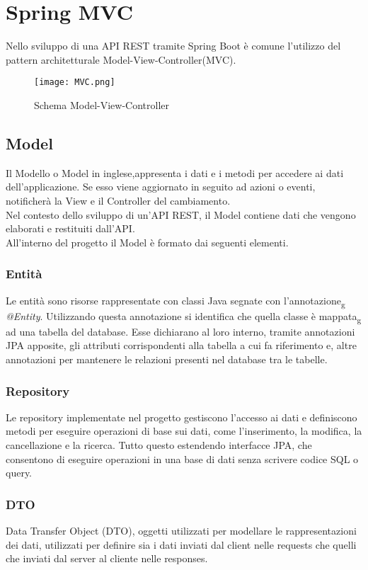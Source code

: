 \section{Spring MVC}
Nello sviluppo di una API REST tramite Spring Boot è comune l'utilizzo del pattern architetturale Model-View-Controller(MVC).\\

\begin{figure}[!h] 
    \centering 
    \texttt{[image: MVC.png]} 
    \caption{Schema Model-View-Controller}
\end{figure}

\subsection{Model}
Il Modello o Model in inglese,appresenta i dati e i metodi per accedere ai dati dell'applicazione. Se esso viene aggiornato in seguito ad azioni o eventi, notificherà la View e il Controller del cambiamento.\\
Nel contesto dello sviluppo di un'API REST, il Model contiene dati che vengono elaborati e restituiti dall'API.\\
All'interno del progetto il Model è formato dai seguenti elementi.
\subsubsection{Entità}
Le entità sono risorse rappresentate con classi Java segnate con l'annotazione\textsubscript{g} \textit{@Entity}. Utilizzando questa annotazione si identifica che quella classe è mappata\textsubscript{g} ad una tabella del database. Esse dichiarano al loro interno, tramite annotazioni JPA apposite, gli attributi corrispondenti alla tabella a cui fa riferimento e, altre annotazioni per mantenere le relazioni presenti nel database tra le tabelle.
\subsubsection{Repository}
Le repository implementate nel progetto gestiscono l'accesso ai dati e definiscono metodi per eseguire operazioni di base sui dati, come l'inserimento, la modifica, la cancellazione e la ricerca. Tutto questo estendendo interfacce JPA, che consentono di eseguire operazioni in una base di dati senza scrivere codice SQL o query.
\subsubsection{DTO}
Data Transfer Object (DTO), oggetti utilizzati per modellare le rappresentazioni dei dati, utilizzati per definire sia i dati inviati dal client nelle requests che quelli che inviati dal server al cliente nelle responses.\\

